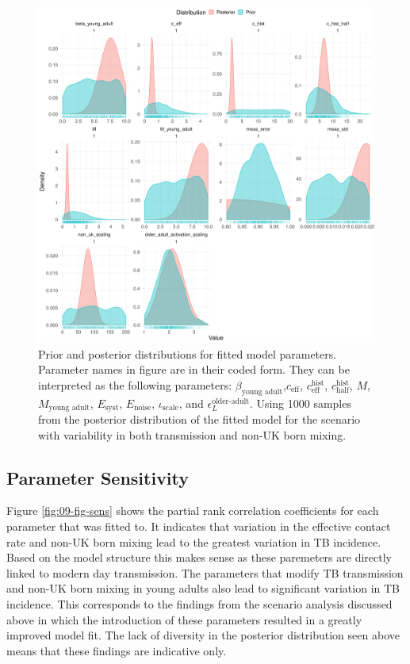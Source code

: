 \documentclass[11pt,twoside]{bristolthesis}
\begin{document}
  \begin{figure}
  
  {\centering \includegraphics[width=0.8\linewidth]{chapters/model-fitting/plots/prior-posterior-overview-1} 
  
  }
  
  \caption[Prior and posterior distributions for fitted model parameters.]{Prior and posterior distributions for fitted model parameters. Parameter names in figure are in their coded form. They can be interpreted as the following parameters:  $\beta_{\text{young adult}}$,$c_{\text{eff}}$, $c^{\text{hist}}_{\text{eff}}$, $c^{\text{hist}}_{\text{half}}$, $M$, $M_{\text{young adult}}$, $E_{\text{syst}}$, $E_{\text{noise}}$, $\iota_{\text{scale}}$, and $\epsilon^{\text{older-adult}}_L$. Using 1000 samples from the posterior distribution of the fitted model for the scenario with variability in both transmission and non-UK born mixing.}\label{fig:09-fig-prior-params}
  \end{figure}
  \hypertarget{parameter-sensitivity-1}{%
  \subsection{Parameter Sensitivity}\label{parameter-sensitivity-1}}
  
  Figure \ref{fig:09-fig-sens} shows the partial rank correlation coefficients for each parameter that was fitted to. It indicates that variation in the effective contact rate and non-UK born mixing lead to the greatest variation in TB incidence. Based on the model structure this makes sense as these paremeters are directly linked to modern day transmission. The parameters that modify TB transmission and non-UK born mixing in young adults also lead to significant variation in TB incidence. This corresponds to the findings from the scenario analysis discussed above in which the introduction of these parameters resulted in a greatly improved model fit. The lack of diversity in the posterior distribution seen above means that these findings are indicative only.
  
\end{document}
